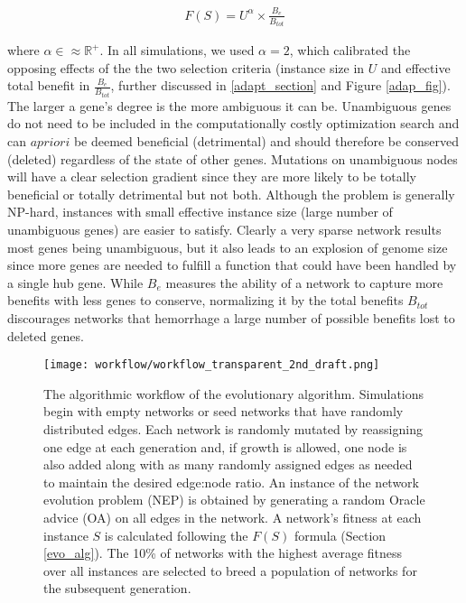 \begin{align*}
F(S) = U^\alpha \times \frac {B_e}{B_{tot}}
\end{align*}

where $\alpha\in \approx \mathbb{R}^{+}$. In all simulations, we used $\alpha=2$, which calibrated the opposing effects \cite{kim_positive_2007} 
of the the two selection criteria (instance size in $U$ and effective total benefit in $\frac {B_e}{B_{tot}}$, 
further discussed in \ref{adapt_section} and Figure \ref{adap_fig}). 
The larger a gene's degree is the more ambiguous it can be. Unambiguous genes do not need to be included in the 
computationally costly optimization search and can $a priori$ be deemed beneficial (detrimental) and should therefore be 
conserved (deleted) regardless of the state of other genes. Mutations on unambiguous nodes will have a clear selection 
gradient since they are more likely to be totally beneficial or totally detrimental but not both. 
Although the problem is generally NP-hard, instances with small effective instance size (large number of unambiguous genes) 
are easier to satisfy. 
Clearly a very sparse network results most genes being unambiguous, but it also leads to an explosion of genome size
since more genes are needed to fulfill a function that could have been handled by a single hub gene. 
While $B_e$ measures the ability of a network to capture more benefits with less genes to conserve, 
normalizing it by the total benefits $B_{tot}$ discourages networks that hemorrhage a large number of possible benefits lost to deleted genes.
\begin{figure}[H]
		\centering
		\texttt{[image: workflow/workflow\_transparent\_2nd\_draft.png]} %
		\caption{The algorithmic workflow of the evolutionary algorithm. 
		Simulations begin with empty networks or seed networks that have randomly distributed edges. 
		Each network is randomly mutated by reassigning one edge at each generation and,  
		if growth is allowed, one node is also added along with as many randomly 
		assigned edges as needed to maintain the desired edge:node ratio. 
		An instance of the network evolution problem (NEP) is obtained by generating a random Oracle advice (OA) on all edges in the network. 
		A network's fitness at each instance $S$ is calculated following the $F(S)$ formula (Section \ref{evo_alg}).
		The 10\% of networks with the highest average fitness over all instances are selected to breed a population of networks for the subsequent generation.}
		\label{workflow}
\end{figure}
%
